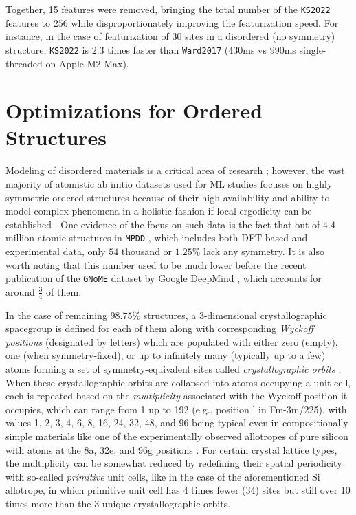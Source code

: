 Together, 15 features were removed, bringing the total number of the \texttt{KS2022} features to $256$ while disproportionately improving the featurization speed. For instance, in the case of featurization of 30 sites in a disordered (no symmetry) structure, \texttt{KS2022} is $2.3$ times faster than \texttt{Ward2017} ($430$ms vs $990$ms single-threaded on Apple M2 Max).

\section{Optimizations for Ordered Structures} \label{sec:ordered}

Modeling of disordered materials is a critical area of research \cite{Zaki2023Glassomics:Intelligence}; however, the vast majority of atomistic ab initio datasets used for ML studies focuses on highly symmetric ordered structures because of their high availability and ability to model complex phenomena in a holistic fashion if local ergodicity can be established \cite{Liu2022TheoryTheorem, Liu2023ThermodynamicsPerspectives}. One evidence of the focus on such data is the fact that out of $4.4$ million atomic structures in \texttt{MPDD} \cite{Krajewski2021MPDD:Database}, which includes both DFT-based \cite{Saal2013MaterialsOQMD, Kirklin2015TheEnergies, Shen2022ReflectionsOQMD, Curtarolo2013AFLOW:Discovery, Toher2018TheDiscovery, Jain2013Commentary:Innovation, Choudhary2020TheDesign, Merchant2023ScalingDiscovery} and experimental \cite{Grazulis2009CrystallographyStructures, Grazulis2012CrystallographyCollaboration, Grazulis2019CrystallographyPerspectives} data, only $54$ thousand or $1.25\%$ lack any symmetry. It is also worth noting that this number used to be much lower before the recent publication of the \texttt{GNoME} dataset by Google DeepMind \cite{Merchant2023ScalingDiscovery}, which accounts for around $\frac{3}{4}$ of them. 

In the case of remaining $98.75\%$ structures, a 3-dimensional crystallographic spacegroup is defined for each of them along with corresponding \emph{Wyckoff positions} (designated by letters) which are populated with either zero (empty), one (when symmetry-fixed), or up to infinitely many (typically up to a few) atoms forming a set of symmetry-equivalent sites called \emph{crystallographic orbits} \cite{Muller2006RemarksPositions}. When these crystallographic orbits are collapsed into atoms occupying a unit cell, each is repeated 
based on the \emph{multiplicity} associated with the Wyckoff position it occupies, which can range from 1 up to 192 (e.g., position l in Fm-3m/225), with values 1, 2, 3, 4, 6, 8, 16, 24, 32, 48, and 96 being typical \cite{Mehl2016ThePrototypes} even in compositionally simple materials like one of the experimentally observed allotropes of pure silicon with atoms at the 8a, 32e, and 96g positions \cite{Gryko2000Low-densityGap}. For certain crystal lattice types, the multiplicity can be somewhat reduced by redefining their spatial periodicity with so-called \textit{primitive} unit cells, like in the case of the aforementioned Si allotrope, in which primitive unit cell has 4 times fewer (34) sites but still over 10 times more than the 3 unique crystallographic orbits.

